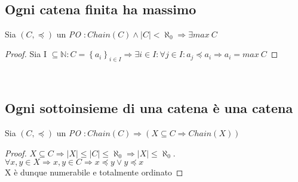 \documentclass[a4paper, 10pt]{article} %
\begin{document}
\
\subsection{Ogni catena finita ha massimo}
\begin{esercizio}
  Sia $(C, \preceq)$ un \emph{PO} $: Chain(C) \land |C| < \aleph_0 \Rightarrow \exists max\ C$
  \begin{proof}
    Sia I $\subseteq \mathbb{N} : C = \left\{a_i\right\}_{i \in I} \Rightarrow \exists i \in I : \forall j \in I : a_j \preceq a_i \Rightarrow a_i = max\ C$
    \end{proof}
\end{esercizio}

\
\subsection{Ogni sottoinsieme di una catena è una catena}
\begin{esercizio}
  Sia $(C, \preceq)$ un \emph{PO} $: Chain(C) \Rightarrow (X \subseteq C \Rightarrow Chain(X))$
  \begin{proof}
    $X \subseteq C \Rightarrow |X| \leq |C| \leq \aleph_0 \Rightarrow |X| \leq \aleph_0$. $\forall x,y \in X \Rightarrow x,y \in C \Rightarrow x \preceq y \lor y \preceq x$\\
    X è dunque numerabile e totalmente ordinato
  \end{proof}
\end{esercizio}

\
\end{document}
